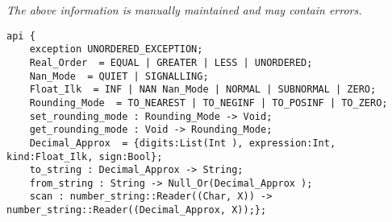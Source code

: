 \label{api:Ieee\_Float}

{\tiny \it The above information is manually maintained and may contain errors.}
\begin{verbatim}
api {
    exception UNORDERED_EXCEPTION;
    Real_Order  = EQUAL | GREATER | LESS | UNORDERED;
    Nan_Mode  = QUIET | SIGNALLING;
    Float_Ilk  = INF | NAN Nan_Mode | NORMAL | SUBNORMAL | ZERO;
    Rounding_Mode  = TO_NEAREST | TO_NEGINF | TO_POSINF | TO_ZERO;
    set_rounding_mode : Rounding_Mode -> Void;
    get_rounding_mode : Void -> Rounding_Mode;
    Decimal_Approx  = {digits:List(Int ), expression:Int, kind:Float_Ilk, sign:Bool};
    to_string : Decimal_Approx -> String;
    from_string : String -> Null_Or(Decimal_Approx );
    scan : number_string::Reader((Char, X)) -> number_string::Reader((Decimal_Approx, X));};
\end{verbatim}
